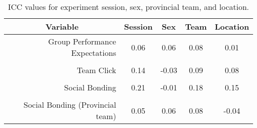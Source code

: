 \begin{table}[]
  \centering

  
\begin{tabular}{@{}rcccc@{}}
\toprule
\multicolumn{1}{c}{\textbf{Variable}} & \textbf{Session} & \textbf{Sex} & \textbf{Team} & \textbf{Location} \\ \midrule
Group Performance Expectations & 0.06 & 0.06 & 0.08 & 0.01 \\
 &  &  &  &  \\
Team Click & 0.14 & -0.03 & 0.09 & 0.08 \\
 &  &  &  &  \\
Social Bonding & 0.21 & -0.01 & 0.18 & 0.15 \\
 &  &  &  &  \\
Social Bonding (Provincial team) & 0.05 & 0.06 & 0.08 & -0.04 \\ \bottomrule
\end{tabular}


\caption{ICC values for experiment session, sex, provincial team, and location.}
\label{tab:trainingICC}
\end{table}
